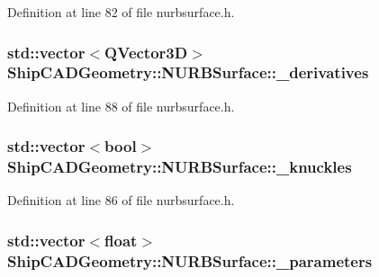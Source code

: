 Definition at line 82 of file nurbsurface.\-h.

\hypertarget{classShipCADGeometry_1_1NURBSurface_afcc62885b941c474e1217d1b9a8143b1}{
\subsubsection[{\-\_\-derivatives}]{\setlength{\rightskip}{0pt plus 5cm}std\-::vector$<$Q\-Vector3\-D$>$ Ship\-C\-A\-D\-Geometry\-::\-N\-U\-R\-B\-Surface\-::\-\_\-derivatives\hspace{0.3cm}{\ttfamily [protected]}}}\label{classShipCADGeometry_1_1NURBSurface_afcc62885b941c474e1217d1b9a8143b1}


Definition at line 88 of file nurbsurface.\-h.

\hypertarget{classShipCADGeometry_1_1NURBSurface_a9d6d1bc4ffd84dcab014313963705389}{
\subsubsection[{\-\_\-knuckles}]{\setlength{\rightskip}{0pt plus 5cm}std\-::vector$<$bool$>$ Ship\-C\-A\-D\-Geometry\-::\-N\-U\-R\-B\-Surface\-::\-\_\-knuckles\hspace{0.3cm}{\ttfamily [protected]}}}\label{classShipCADGeometry_1_1NURBSurface_a9d6d1bc4ffd84dcab014313963705389}


Definition at line 86 of file nurbsurface.\-h.

\hypertarget{classShipCADGeometry_1_1NURBSurface_a61d19bf03c2aef8db727a199308da45a}{
\subsubsection[{\-\_\-parameters}]{\setlength{\rightskip}{0pt plus 5cm}std\-::vector$<$float$>$ Ship\-C\-A\-D\-Geometry\-::\-N\-U\-R\-B\-Surface\-::\-\_\-parameters\hspace{0.3cm}{\ttfamily [protected]}}}\label{classShipCADGeometry_1_1NURBSurface_a61d19bf03c2aef8db727a199308da45a}


